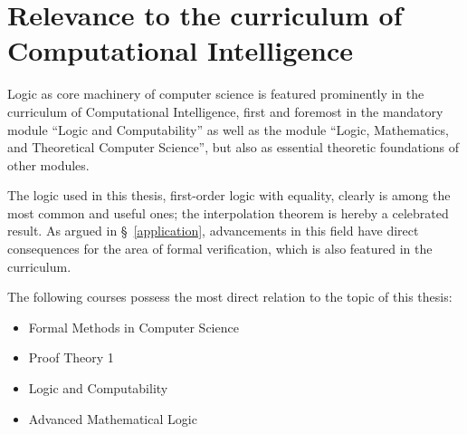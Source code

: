 \documentclass[,%
			paper=a4,%
			DIV10,
			liststotoc,
			bibtotoc,
			draft=false,%
			numbers=noendperiod
			]{scrartcl}
\begin{document}
\section{Relevance to the curriculum of Computational Intelligence}

Logic as core machinery of computer science is featured prominently in the curriculum of Computational Intelligence, first and foremost in the mandatory module ``Logic and Computability'' as well as the module ``Logic, Mathematics, and Theoretical Computer Science'', but also as essential theoretic foundations of other modules. 

The logic used in this thesis, first-order logic with equality, clearly is among the most common and useful ones; the interpolation theorem is hereby a celebrated result.
As argued in \S~\ref{application}, advancements in this field have direct consequences for the area of formal verification, which is also featured in the curriculum.

The following courses possess the most direct relation to the topic of this thesis: 
\begin{itemize}
	\item Formal Methods in Computer Science
	\item Proof Theory 1 
	\item Logic and Computability 
	\item Advanced Mathematical Logic 
\end{itemize}




\end{document}
